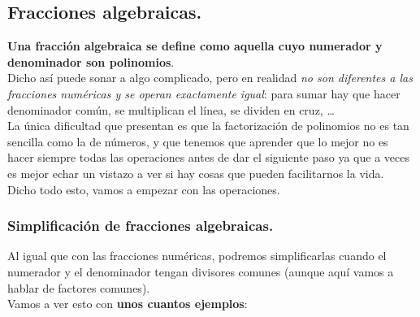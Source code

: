 \documentclass[a4paper,11pt,answers]{exam}
\begin{document}
\subsection{Fracciones algebraicas.}
\textbf{Una fracción algebraica se define como aquella cuyo numerador y denominador son polinomios}.\\

Dicho así puede sonar a algo complicado, pero en realidad \emph{no son diferentes a las fracciones numéricas
  y se operan exactamente igual}: para sumar hay que hacer denominador común, se multiplican el línea, se dividen en cruz, \dots\\

La única dificultad que presentan es que la factorización de polinomios no es tan sencilla como la de números, y que tenemos que aprender que lo mejor no es hacer siempre todas las operaciones antes de dar el siguiente paso ya que a veces es mejor echar un vistazo a ver si hay cosas que pueden facilitarnos la vida.\\

Dicho todo esto, vamos a empezar con las operaciones.

\subsubsection{Simplificación de fracciones algebraicas.}
Al igual que con las fracciones numéricas, podremos simplificarlas cuando el numerador y el denominador tengan divisores comunes (aunque aquí vamos a hablar de factores comunes).\\

Vamos a ver esto con \textbf{unos cuantos ejemplos}:\\
\end{document}

